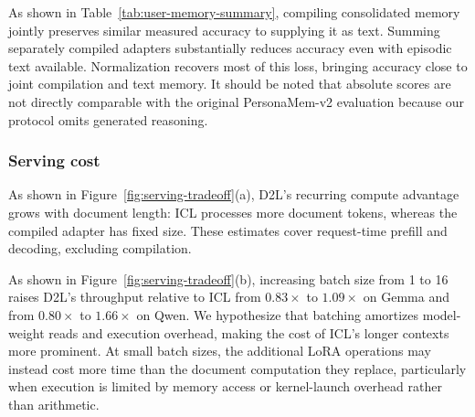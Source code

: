 As shown in Table~\ref{tab:user-memory-summary}, compiling consolidated memory
jointly preserves similar measured accuracy to supplying it as text.
Summing separately compiled adapters substantially reduces accuracy even
with episodic text available. Normalization recovers most of this loss,
bringing accuracy close to joint compilation and text memory.
It should be noted that absolute scores are not directly comparable with the original PersonaMem-v2
evaluation because our protocol omits generated reasoning.

\subsubsection{Serving cost}


As shown in Figure~\ref{fig:serving-tradeoff}(a), D2L's recurring compute
advantage grows with document length: ICL processes more document tokens,
whereas the compiled adapter has fixed size. These estimates cover
request-time prefill and decoding, excluding compilation.

As shown in Figure~\ref{fig:serving-tradeoff}(b), increasing batch size from
1 to 16 raises D2L's throughput relative to ICL from $0.83\times$ to
$1.09\times$ on Gemma and from $0.80\times$ to $1.66\times$ on Qwen.
We hypothesize that batching amortizes model-weight reads and execution
overhead, making the cost of ICL's longer contexts more prominent.
At small batch sizes, the additional LoRA operations may instead cost more
time than the document computation they replace, particularly when execution
is limited by memory access or kernel-launch overhead rather than arithmetic.
